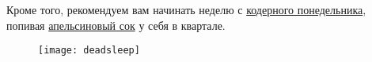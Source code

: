 Кроме того, рекомендуем вам начинать неделю с 
\href{https://freecx.github.io/}{кодерного понедельника},
попивая \href{https://citrux.github.io/blog/}{апельсиновый сок} у себя в квартале.

\begin{figure}[ht!]
    \centering
    \texttt{[image: deadsleep]}
\end{figure}

\setcounter{section}{\value{oldsection}}